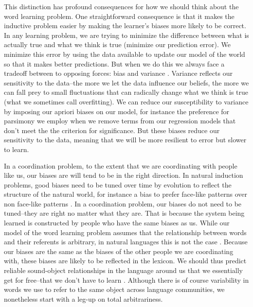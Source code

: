 \documentclass[review]{elsarticle}
\begin{document}
This distinction has profound consequences for how we should think about the word learning problem. One straightforward consequence is that it makes the inductive problem easier by making the learner's biases more likely to be correct. In any learning problem, we are trying to minimize the difference between what is actually true and what we think is true (minimize our prediction error). We minimize this error by using the data available to update our model of the world so that it makes better predictions. But when we do this we always face a tradeoff between to opposing forces: bias and variance \cite{hastie2009}. Variance reflects our sensitivity to the data--the more we let the data influence our beliefs, the more we can fall prey to small fluctuations that can radically change what we think is true (what we sometimes call overfitting). We can reduce our susceptibility to variance by imposing our apriori biases on our model, for instance the preference for parsimony we employ when we remove terms from our regression models that don't meet the the criterion for significance. But these biases reduce our sensitivity to the data, meaning that we will be more resilient to error but slower to learn.

In a coordination problem, to the extent that we are coordinating with people like us, our biases are will tend to be in the right direction. In  natural induction problems, good biases need to be tuned over time by evolution to reflect the structure of the natural world, for instance a bias to prefer face-like patterns over non face-like patterns \citep{johnson1991}. In a coordination problem, our biases do not need to be tuned--they are right no matter what they are. That is because the system being learned is constructed by people who have the same biases as us. While our model of the word learning problem assumes that the relationship between words and their referents is arbitrary, in natural languages this is not the case \citep{saussure1960}. Because our biases are the same as the biases of the other people we are coordinating with, these biases are likely to be reflected in the lexicon. We should thus predict reliable sound-object relationships in the language around us that we essentially get for free--that we don't have to learn \citep{lewis2016,maurer2006,perry2015}. Although there is of course variability in words we use to refer to the same object across language communities, we nonetheless start with a leg-up on total arbitrariness.  
\end{document}
